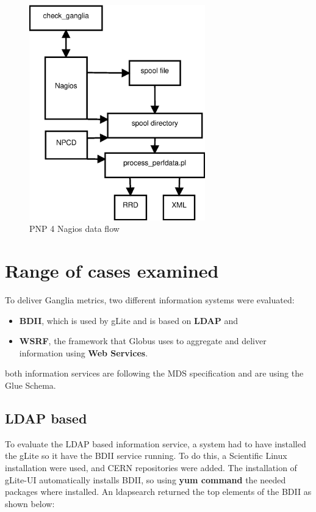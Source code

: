 \begin{figure}[htb]
\centering
 \includegraphics[width=3in]{images/npcd_pnp4nagios.eps}
\caption{PNP 4 Nagios data flow}
\label{figure:pnp4nagios}
\end{figure}

\section{Range of cases examined}

To deliver Ganglia metrics, two different information systems were evaluated:
\begin{itemize}
  \item {\bf BDII}, which is used by gLite and is based on {\bf LDAP} and
  \item {\bf WSRF}, the framework that Globus uses to aggregate and deliver information using {\bf Web Services}.
\end{itemize}

both information services are following the MDS specification and are using the Glue Schema.

\subsection{LDAP based}

To evaluate the LDAP based information service, a system had to have installed the gLite so it have the BDII service running. To do this, a Scientific Linux installation were used, and CERN repositories were added. The installation of gLite-UI automatically installs BDII, so using {\bf yum command} the needed packages where installed. An ldapsearch returned the top elements of the BDII as shown below:

